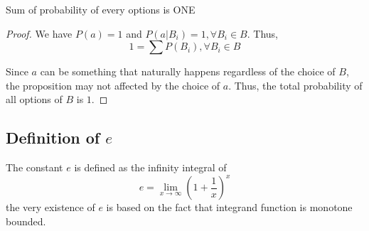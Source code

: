 \begin{proposition}
    \label{Proposition: Sum of probability of every options is ONE}
    Sum of probability of every options is ONE

    \begin{proof}
        We have $P(a) = 1$ and $P(a|B_i)=1, \forall B_i \in B$.
        Thus,
        \begin{equation*}
            1 = \sum P(B_i), \forall B_i \in B
        \end{equation*}

        Since $a$ can be something that naturally happens regardless of the choice of $B$, the proposition may not affected by the choice of $a$.
        Thus, the total probability of all options of $B$ is $1$.
    \end{proof}
\end{proposition}

\subsection{Definition of $e$}

The constant $e$ is defined as the infinity integral of
\begin{equation}
    \label{Equation: Definition of e}
    e = \lim_{x \to \infty} (1+\frac{1}{x})^x
\end{equation}
the very existence of $e$ is based on the fact that integrand function is monotone bounded.

